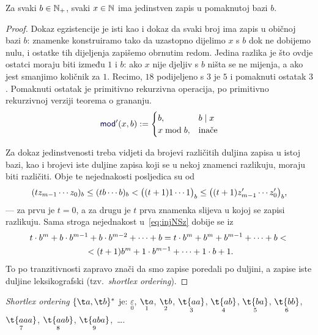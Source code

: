 \begin{lema}[{name=[egzistencija i jedinstvenost zapisa u pomaknutoj bazi]}]\label{lm:pomakbaza}
Za svaki $b\in{\mathbb N}_+$, svaki $x\in{\mathbb N}$ ima jedinstven zapis u pomaknutoj bazi $b$.
\end{lema}
\begin{proof}
Dokaz egzistencije je isti kao i dokaz da svaki broj ima zapis u običnoj bazi $b$: znamenke konstruiramo tako da uzastopno dijelimo $x$ s $b$ dok ne dobijemo nulu, i ostatke tih dijeljenja zapišemo obrnutim redom. Jedina razlika je što ovdje ostatci moraju biti između $1$ i $b$: ako $x$ nije djeljiv s $b$ ništa se ne mijenja, a ako jest smanjimo količnik za $1$. Recimo, $18$ podijeljeno s $3$ je $5$ i pomaknuti ostatak $3$. Pomaknuti ostatak je primitivno rekurzivna operacija, po primitivno rekurzivnoj verziji teorema o grananju.
\begin{equation}
    \f{mod}'(x,b):=\begin{cases}
        b,&b\mid x\\
        x\bmod b,&\text{inače}
    \end{cases}
\end{equation}

Za dokaz jedinstvenosti treba vidjeti da brojevi različitih duljina zapisa u istoj bazi, kao i brojevi iste duljine zapisa koji se u nekoj znamenci razlikuju, moraju biti različiti. Obje te nejednakosti posljedica su od
\begin{equation}
\label{eq:injNSz}
    (tz_{m-1}\dotsm z_0)_b\le
    (tb\dotsm b)_b<
    \bigl((t+1)1\dotsm1\bigr)_b\le
    \bigl((t+1)z_{m-1}'\dotsm z_0'\bigr)_b\text,
\end{equation}
--- za prvu je $t=0$, a za drugu je $t$ prva znamenka slijeva u kojoj se zapisi razlikuju. Sama stroga nejednakost u~\eqref{eq:injNSz} dobije se iz
\begin{multline}
    t\cdot b^m+b\cdot b^{m-1}+b\cdot b^{m-2}+\dotsb+b=
    t\cdot b^m+b^m+b^{m-1}+\dotsb+b<{}\\
    {}<(t+1)b^m+1\cdot b^{m-1}+\dotsb+1\cdot b+1\text.
\end{multline}
To po tranzitivnosti zapravo znači da smo zapise poredali po duljini, a zapise iste duljine leksikografski (tzv.\ \emph{shortlex ordering}).
\end{proof}

\begin{primjer}[{name=[\emph{shortlex ordering} svih riječi nad dvočlanom abecedom]}]
\emph{Shortlex ordering} $\{\t a,\t b\}^*$ je: $\underset{0}{\varepsilon}$, 
$\underset{1}{\t a}$, 
$\underset{2}{\t b}$, 
$\underset{3}{\t{aa}}$, 
$\underset{4}{\t{ab}}$,
$\underset{5}{\t{ba}}$, 
$\underset{6}{\t{bb}}$,
$\underset{7}{\t{aaa}}$,
$\underset{8}{\t{aab}}$,
$\underset{9}{\t{aba}}$,~\ldots.
\end{primjer}

